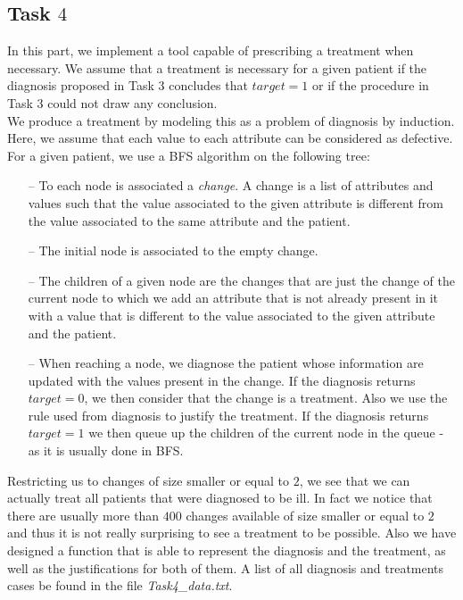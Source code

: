 \documentclass[9pt]{extarticle}
\begin{document}
\subsection{Task $4$}
	In this part, we implement a tool capable of prescribing a treatment when necessary. We assume that a treatment is necessary for a given patient if the diagnosis proposed in Task $3$ concludes that $target=1$ or if the procedure in Task $3$ could not draw any conclusion.\\
	We produce a treatment by modeling this as a problem of diagnosis by induction. Here, we assume that each value to each attribute can be considered as defective. For a given patient, we use a BFS algorithm on the following tree:
	\begin{itemize}[topsep=0pt,itemsep=0pt,partopsep=0pt, parsep=0pt]
		\item[--] To each node is associated a \emph{change}. A change is a list of attributes and values such that the value associated to the given attribute is different from the value associated to the same attribute and the patient.
		\item[--] The initial node is associated to the empty change.
		\item[--] The children of a given node are the changes that are just the change of the current node to which we add an attribute that is not already present in it with a value that is different to the value associated to the given attribute and the patient.
		\item[--] When reaching a node, we diagnose the patient whose information are updated with the values present in the change. If the diagnosis returns $target=0$, we then consider that the change is a treatment. Also we use the rule used from diagnosis to justify the treatment. If the diagnosis returns $target=1$ we then queue up the children of the current node in the queue - as it is usually done in BFS.
	\end{itemize}
Restricting us to changes of size smaller or equal to $2$, we see that we can actually treat all patients that were diagnosed to be ill. In fact we notice that there are usually more than $400$ changes available of size smaller or equal to $2$ and thus it is not really surprising to see a treatment to be possible. Also we have designed a function that is able to represent the diagnosis and the treatment, as well as the justifications for both of them. A list of all diagnosis and treatments cases be found in the file \emph{Task4\_data.txt}.
\end{document}
